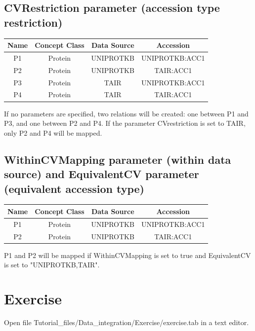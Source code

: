 \subsection{CVRestriction parameter (accession type restriction)} 
\begin{center}
\begin{tabular}{|c|c|c|c|}\hline
Name & Concept Class & Data Source & Accession\\ \hline			
P1 & Protein & UNIPROTKB & UNIPROTKB:ACC1\\
P2 & Protein & UNIPROTKB & TAIR:ACC1\\
P3 & Protein & TAIR & UNIPROTKB:ACC1\\
P4 & Protein & TAIR & TAIR:ACC1\\
\hline  
\end{tabular}
\end{center}
\vspace{0.5cm}
If no parameters are specified, two relations will be created: one between P1 and P3, and one between P2 and P4.
If the parameter CVrestriction is set to TAIR, only P2 and P4 will be mapped.

\subsection{WithinCVMapping parameter (within data source) and EquivalentCV parameter (equivalent accession type)} 
\begin{center}
\begin{tabular}{|c|c|c|c|}\hline
Name & Concept Class & Data Source & Accession\\ \hline			
P1 & Protein & UNIPROTKB & UNIPROTKB:ACC1\\
P2 & Protein & UNIPROTKB & TAIR:ACC1\\
\hline  
\end{tabular}
\end{center}
\vspace{0.5cm}
P1 and P2 will be mapped if WithinCVMapping is set to true and EquivalentCV is set to "UNIPROTKB,TAIR".


\section{Exercise}
Open file Tutorial\_files/Data\_integration/Exercise/exercise.tab in a text editor.
